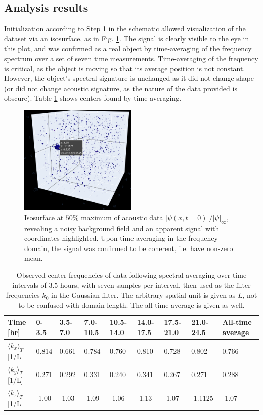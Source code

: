 \documentclass{article}
\begin{document}
\subsection{Analysis results}
Initialization according to Step 1 in the schematic allowed visualization of the dataset via an isosurface, as in Fig. \ref{iso}. The signal is clearly visible to the eye in this plot, and was confirmed as a real object by time-averaging of the frequency spectrum over a set of seven time measurements. Time-averaging of the frequency is critical, as the object is moving so that its average position is not constant. However, the object's spectral signature is unchanged as it did not change shape (or did not change acoustic signature, as the nature of the data provided is obscure). Table \ref{frequencies} shows centers found by time averaging.

\begin{figure}[ht]
  \centering
  \includegraphics[width=0.5\textwidth]{pics/iso}
  \caption{Isosurface at $50\%$ maximum of acoustic data $|\psi(x,t=0)|/|\psi|_\infty$, revealing a noisy background field and an apparent signal with coordinates highlighted. Upon time-averaging in the frequency domain, the signal was confirmed to be coherent, i.e. have non-zero mean.}\label{iso}
\end{figure}

\begin{table}[b]
  \centering
  \begin{tabular}{|l|l|l|l|l|l|l|l|l|}
    \hline
    Time {[}hr{]}   & 0-3.5 & 3.5-7.0 & 7.0-10.5 & 10.5-14.0 & 14.0-17.5 & 17.5-21.0 & 21.0-24.5 & All-time average \\ \hline
    $\langle k_x\rangle_T$ {[}1/L{]} & 0.814 & 0.661   & 0.784    & 0.760     & 0.810     & 0.728     & 0.802     & 0.766            \\ \hline
    $\langle k_y\rangle_T$ {[}1/L{]} & 0.271 & 0.292   & 0.331    & 0.240     & 0.341     & 0.267     & 0.271     & 0.288            \\ \hline
    $\langle k_z\rangle_T$ {[}1/L{]} & -1.00 & -1.03   & -1.09    & -1.06     & -1.13     & -1.07     & -1.1125   & -1.07            \\ \hline
  \end{tabular}
  \caption{Observed center frequencies of data following spectral averaging over time intervals of $3.5$ hours, with seven samples per interval, then used as the filter frequencies $k_0$ in the Gaussian filter. The arbitrary spatial unit is given as $L$, not to be confused with domain length. The all-time average is given as well.}\label{frequencies}
\end{table}
\end{document}
